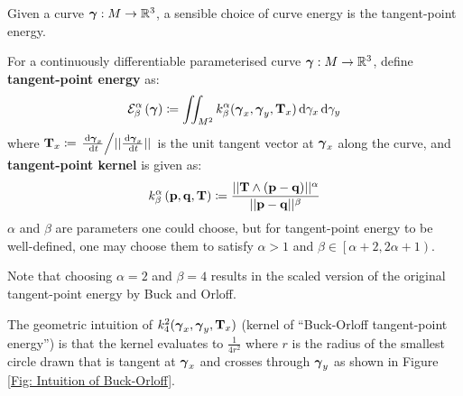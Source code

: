 \documentclass[../dissertation.tex]{subfiles}
\begin{document}
Given a curve $\boldsymbol{\gamma}:M \rightarrow \mathbb{R}^3$,
a sensible choice of curve energy is the tangent-point energy\cite{YSC2021}.
\begin{definition}
    For a continuously differentiable parameterised curve $\boldsymbol{\gamma}:M \rightarrow \mathbb{R}^3$, define \textbf{tangent-point energy} as:
    \begin{equation}
        \mathcal{E}_{\beta}^{\alpha} \left( \boldsymbol{\gamma} \right) \coloneqq \iint_{M^2} k_{\beta}^{\alpha} (\boldsymbol{\gamma}_x, \boldsymbol{\gamma}_y, \mathbf{T}_x) \, \text{d} \gamma_x \, \text{d} \gamma_y 
        \label{equ: Tangent-Point Energy}
    \end{equation}
    where $\mathbf{T}_x \coloneqq \left. \frac{\, \text{d} \boldsymbol{\gamma}_x}{\, \text{d} t} \middle/ \lvert \lvert \frac{\, \text{d} \boldsymbol{\gamma}_x}{\, \text{d} t} \rvert \rvert \right. $ is the unit tangent vector at $\boldsymbol{\gamma}_x$ along the curve,
    and \textbf{tangent-point kernel} is given as:
    \begin{equation}
        k_{\beta}^{\alpha} \left( \mathbf{p}, \mathbf{q}, \mathbf{T} \right) \coloneqq \frac{\lvert \lvert \mathbf{T} \wedge \left( \mathbf{p} - \mathbf{q} \right) \rvert \rvert^{\alpha}}{\lvert \lvert \mathbf{p} - \mathbf{q} \rvert \rvert^{\beta}}
    \end{equation}
    $\alpha$ and $\beta$ are parameters one could choose, but for tangent-point energy to be well-defined,
    one may choose them to satisfy $\alpha >1$ and $\beta \in \left[ \alpha+2, 2\alpha + 1 \right)$.

    Note that choosing $\alpha = 2$ and $\beta = 4$ results in the scaled version of the original tangent-point energy by Buck and Orloff\cite{BO1995}.
\end{definition}
The geometric intuition of $k_{4}^2 (\boldsymbol{\gamma}_x, \boldsymbol{\gamma}_y, \mathbf{T}_x)$ (kernel of ``Buck-Orloff tangent-point energy'') is that the kernel evaluates to $\frac{1}{4r^2}$ where $r$ is the radius of the smallest circle drawn that is tangent at $\boldsymbol{\gamma}_x$ and crosses through $\boldsymbol{\gamma}_y$
as shown in Figure \ref{Fig: Intuition of Buck-Orloff}.
\end{document}
